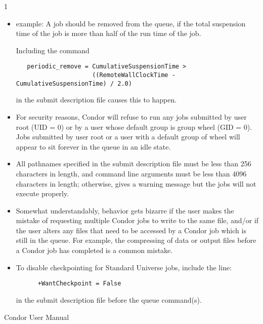 \begin{ManPage}{\label{man-condor-submit}}{1}
\begin{itemize}
\item{ example:}
A job should be removed from the queue,
if the total suspension time of the job
is more than half of the run time of the job.

Including the command
\footnotesize
\begin{verbatim}
   periodic_remove = CumulativeSuspensionTime > 
                     ((RemoteWallClockTime - CumulativeSuspensionTime) / 2.0)
\end{verbatim}
\normalsize
in the submit description file causes this to happen.

\end{itemize} 


\GenRem
\begin{itemize}

\item For security reasons, Condor will refuse to run any jobs submitted
by user root (UID = 0) or by a user whose default group is group wheel
(GID = 0). Jobs submitted by user root or a user with a default group of
wheel will appear to sit forever in the queue in an idle state. 

\item All pathnames specified in the submit description file must be
less than 256 characters in length, and command line arguments must be
less than 4096 characters in length; otherwise,  gives a
warning message but the jobs will not execute properly. 

\item Somewhat understandably, behavior gets bizarre if the user makes
the mistake of requesting multiple Condor jobs to write to the
same file, and/or if the user alters any files that need to be accessed
by a Condor job which is still in the queue.
For example, the compressing of data or
output files before a Condor job has completed is a common mistake.

\item To disable checkpointing for Standard Universe jobs, include the
line:
\begin{verbatim}
      +WantCheckpoint = False
\end{verbatim}
in the submit description file before the queue command(s).
\end{itemize}

\SeeAlso
Condor User Manual

\end{ManPage}

